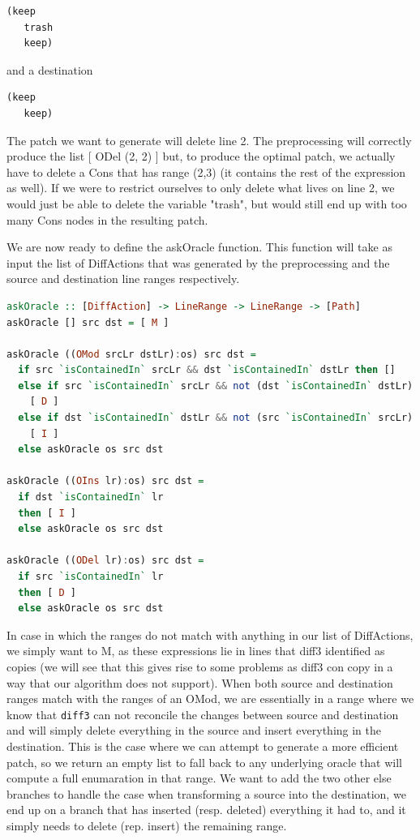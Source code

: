 \documentclass[11pt]{article}
\begin{document}
\begin{lstlisting}[language=lisp]
 (keep
   trash
   keep)
\end{lstlisting}

and a destination 

\begin{lstlisting}[language=lisp]
 (keep
   keep)
\end{lstlisting}

The patch we want to generate will delete line 2. The preprocessing will correctly produce the list [ ODel (2, 2) ] 
but, to produce the optimal patch, we actually have to delete a Cons that has 
range (2,3) (it contains the rest of the expression as well). If we were to restrict ourselves to only delete 
what lives on line 2, we would just be able to delete the variable "trash", but would still end up with too 
many Cons nodes in the resulting patch.

We are now ready to define the askOracle function. This function will take as input the list of DiffActions that 
was generated by the preprocessing and the source and destination line ranges respectively. 

\begin{lstlisting}[language=haskell]
askOracle :: [DiffAction] -> LineRange -> LineRange -> [Path]
askOracle [] src dst = [ M ]

askOracle ((OMod srcLr dstLr):os) src dst =
  if src `isContainedIn` srcLr && dst `isContainedIn` dstLr then []
  else if src `isContainedIn` srcLr && not (dst `isContainedIn` dstLr) then
    [ D ]
  else if dst `isContainedIn` dstLr && not (src `isContainedIn` srcLr) then
    [ I ]
  else askOracle os src dst

askOracle ((OIns lr):os) src dst =
  if dst `isContainedIn` lr
  then [ I ]
  else askOracle os src dst

askOracle ((ODel lr):os) src dst =
  if src `isContainedIn` lr
  then [ D ]
  else askOracle os src dst
\end{lstlisting}

In case in which the ranges do 
not match with anything in our list of DiffActions, we simply want to M, as 
these expressions lie in lines that diff3 identified as copies (we will see that this gives rise to some problems
as diff3 con copy in a way that our algorithm does not support). When both 
source and destination ranges match with the ranges of an OMod, we are essentially in a range where
we know that \texttt{diff3} can not reconcile the changes between source and destination 
and will simply delete everything in the source and insert everything in the 
destination. This is the case where we can attempt to generate a more efficient 
patch, so we return an empty list to fall back to any underlying oracle that 
will compute a full enumaration in that range. We want to add the two other else 
branches to handle the case when transforming a source into the destination, we 
end up on a branch that has inserted (resp. deleted) everything it had to, and 
it simply needs to delete (rep. insert) the remaining range.
\end{document}
